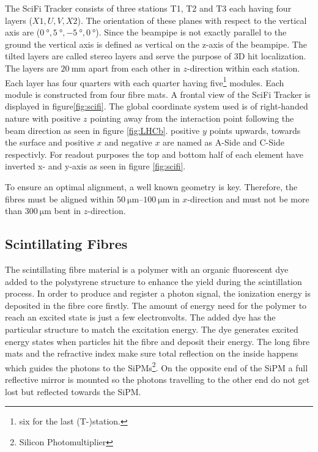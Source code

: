 The SciFi Tracker consists of three stations T1, T2 and T3 each having four layers ($X1, U, V, X2$). The orientation of these planes with respect to the vertical axis are ($\SI{0}{\degree}, \SI{+5}{\degree}, \SI{-5}{\degree}, \SI{0}{\degree}$).
Since the beampipe is not exactly parallel to the ground the vertical axis is
defined as vertical on the z-axis of the beampipe.
The tilted layers are called stereo layers and serve the purpose of 3D hit localization.
The layers are $\SI{20}{\milli\metre}$ apart from each other in $z$-direction within each station.
Each layer has four quarters with each quarter having five\footnote{six for the last (T-)station.} modules. Each module is constructed from four fibre mats.
A frontal view of the SciFi Tracker is displayed in figure\ref{fig:scifi}.
The global coordinate system used is of right-handed nature with positive $z$ pointing away from the interaction point following the beam direction as seen in figure \ref{fig:LHCb}. positive $y$ points upwards, towards the surface and positive $x$ and negative $x$ are named as A-Side and C-Side respectivly\cite{scifiInfo}.
For readout purposes the top and bottom half of each element have inverted x- and y-axis as seen in figure \ref{fig:scifi}.

To ensure an optimal alignment, a well known geometry is key. Therefore, the
fibres must be aligned within $\SIrange{50}{100}{\micro\metre}$ in $x$-direction and must not be more than $\SI{300}{\micro\metre}$ bent in $z$-direction.

\subsection{Scintillating Fibres}
The scintillating fibre material is a polymer with an organic fluorescent dye
added to the polystyrene structure to enhance the yield during the scintillation process.
In order to produce and register a photon signal, the ionization energy is deposited
in the fibre core firstly. The amount of energy need for the polymer to reach an
excited state is just a few electronvolts. The added dye has the particular structure
to match the excitation energy. The dye generates excited energy states when
particles hit the fibre and deposit their energy.
The long fibre mats and the refractive index make sure total reflection on the inside
happens which guides the photons to the SiPMs\footnote{Silicon Photomultiplier}.
On the opposite end of the SiPM a full reflective mirror is mounted so the photons travelling to the other end do not get lost but reflected towards the SiPM.

